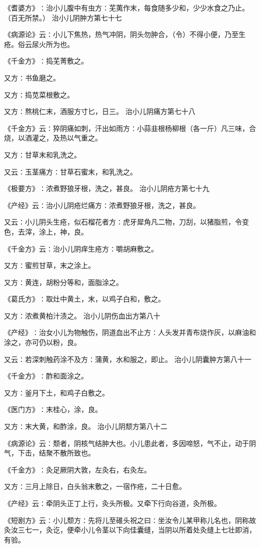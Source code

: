 \documentclass[a4paper,12pt,UTF8,twoside]{ctexbook}
\begin{document}
《耆婆方》∶治小儿腹中有虫方∶芜荑作末，每食随多少和，少少水食之乃止。（百无所禁。）
治小儿阴肿方第七十七

《病源论》云∶小儿下焦热，热气冲阴，阴头勿肿合，（令）不得小便，乃至生疮。俗云尿火所为也。

《千金方》∶捣芜菁敷之。

又方∶书鱼磨之。

又方∶捣苋菜根敷之。

又方∶熬桃仁末，酒服方寸匕，日三。
治小儿阴痛方第七十八

《千金方》云∶猝阴痛如刺，汗出如雨方∶小蒜韭根杨柳根（各一斤）凡三味，合烧，以酒灌之，及热以气重之。

又方∶甘草末和乳洗之。

又云∶玉茎痛方∶甘草石蜜末，和乳洗之。

《极要方》∶浓煮野狼牙根，洗之，甚良。
治小儿阴疮方第七十九

《产经》云∶治小儿阴疮烂痛方∶浓煮野狼牙根，洗之，甚良。

又云∶小儿阴头生疮，似石榴花者方∶虎牙犀角凡二物，刀刮，以猪脂煎，令变色，去滓，涂上，神，良。

《千金方》云∶治小儿阴痒生疮方∶嚼胡麻敷之。

又方∶蜜煎甘草，末之涂上。

又方∶黄连，胡粉分等和，面脂涂之。

《葛氏方》∶取灶中黄土，末，以鸡子白和，敷之。

又方∶浓煮黄柏汁渍之。
治小儿阴伤血出方第八十

《产经》∶治女小儿为物触伤，阴道血出不止方∶人头发并青布烧作灰，以麻油和涂之，亦可仍以粉，良。

又云∶若深刺触药涂不及方∶蒲黄，水和服之，即止。
治小儿阴囊肿方第八十一

《千金方》∶酢和面涂之。

又方∶釜月下土，和鸡子白敷之。

《医门方》∶末桂心，涂，良。

又方∶末大黄，和酢涂，良。
治小儿阴颓方第八十二

《病源论》云∶颓者，阴核气结肿大也。小儿患此者，多因啼怒，气不止，动于阴气，下击，结聚不散所致也。

《千金方》∶灸足厥阴大敦，左灸右，右灸左。

又方∶三月上除日，白头翁末敷之，一宿作疮，二十日愈。

《产经》云∶牵阴头正丁上行，灸头所极。又牵下行向谷道，灸所极。

《短剧方》云∶小儿颓方∶先将儿至碓头祝之曰∶坐汝令儿某甲称儿名也，阴称故灸汝三七一，灸讫，便牵小儿令茎以下向佳囊缝，当阴以所着处灸缝上七壮即消，有验。
\end{document}
